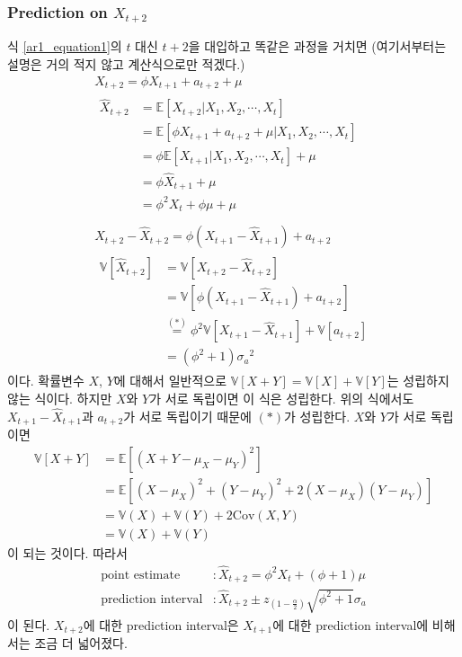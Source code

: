 \documentclass{article}
\newcommand\cov{\ensuremath{\text{Cov}}}
\newcommand\sa{\ensuremath{{\sigma_a}}}
\begin{document}
%
\subsubsection{Prediction on \(X_{t+2}\)}
식 \eqref{ar1_equation1}의 \(t\) 대신 \(t+2\)을 대입하고 똑같은 과정을 거치면
(여기서부터는 설명은 거의 적지 않고 계산식으로만 적겠다.)
\begin{gather*}
X_{t+2}=\phi X_{t+1}+a_{t+2}+\mu\\
\begin{aligned}
\hat X_{t+2}
&=\mathbb E[X_{t+2}|X_1,X_2,\cdots,X_t]\\
&=\mathbb E[\phi X_{t+1}+a_{t+2}+\mu|X_1,X_2,\cdots,X_t]\\
&=\phi\mathbb E[X_{t+1}|X_1,X_2,\cdots,X_t]+\mu\\
&=\phi\hat X_{t+1}+\mu\\
&=\phi^2X_t+\phi\mu+\mu\\
\end{aligned}\\
X_{t+2}-\hat X_{t+2}=\phi\left(X_{t+1}-\hat X_{t+1}\right)+a_{t+2}\\
\begin{aligned}
\mathbb V[\hat X_{t+2}]
&=\mathbb V[X_{t+2}-\hat X_{t+2}]\\
&=\mathbb V[\phi\left(X_{t+1}-\hat X_{t+1}\right)+a_{t+2}]\\
&\stackrel{(*)}=\phi^2\mathbb V\left[X_{t+1}-\hat X_{t+1}\right]+\mathbb V[a_{t+2}]\\
&=(\phi^2+1)\sa^2
\end{aligned}
\end{gather*}
이다.
확률변수 \(X\), \(Y\)에 대해서 일반적으로 \(\mathbb V[X+Y]=\mathbb V[X]+\mathbb V[Y]\)는 성립하지 않는 식이다.
하지만 \(X\)와 \(Y\)가 서로 독립이면 이 식은 성립한다.\footnotemark
위의 식에서도  \(X_{t+1}-\hat X_{t+1}\)과 \(a_{t+2}\)가 서로 독립이기 때문에 \((*)\)가 성립한다.
\(X\)와 \(Y\)가 서로 독립이면
\begin{align*}
\mathbb V[X+Y]
&=\mathbb E\left[(X+Y-\mu_X-\mu_Y)^2\right]\\
&=\mathbb E\left[(X-\mu_X)^2+(Y-\mu_Y)^2+2(X-\mu_X)(Y-\mu_Y)\right]\\
&=\mathbb V(X)+\mathbb V(Y)+2\cov(X,Y)\\
&=\mathbb V(X)+\mathbb V(Y)
\end{align*}
이 되는 것이다.
따라서
\begin{align*}
\text{point estimate}		&:\hat X_{t+2} = \phi^2 X_t+(\phi+1)\mu\\
\text{prediction interval}	&:\hat X_{t+2}\pm z_{(1-\frac\alpha2)}\sqrt{\phi^2+1}\sa
\end{align*}
이 된다.
\(X_{t+2}\)에 대한 prediction interval은 \(X_{t+1}\)에 대한 prediction interval에 비해서는 조금 더 넓어졌다.
\end{document}
